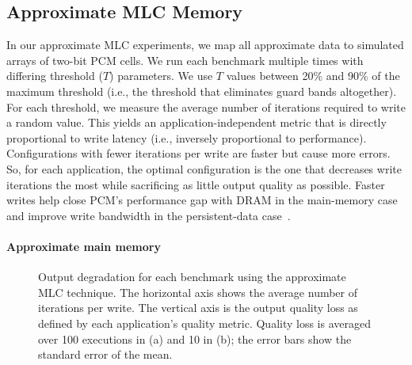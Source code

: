 \subsection{Approximate MLC Memory}

In our approximate MLC experiments, we map all approximate data to simulated
arrays of two-bit PCM cells. We run each benchmark multiple times with
differing threshold ($T$) parameters. We use $T$ values between 20\%
and 90\% of the maximum threshold (i.e., the threshold that eliminates
guard bands altogether).
For each threshold, we measure the
average number of iterations required to write a random value.
This yields an application-independent metric that is
directly proportional to write latency (i.e., inversely
proportional to performance). Configurations with fewer iterations per write
are faster but cause more errors. So, for each application, the optimal
configuration is the one that decreases write iterations the most while
sacrificing as little output quality as possible.
Faster writes help close PCM's performance gap with DRAM in the main-memory
case and improve write bandwidth in the persistent-data
case~\cite{pcm-dram-alt,flash-retention-relax}.

\paragraph{Approximate main memory}

\begin{figure}
    \centering
    \caption{
        Output degradation for each benchmark using the approximate
        MLC technique.
        The horizontal
        axis shows the average number of iterations per write.
        The vertical axis is the output quality loss as
        defined by each application's quality metric.
        Quality loss is averaged over 100 executions in (a) and 10 in (b); the
        error bars show the standard error of the mean.
    }
\end{figure}


